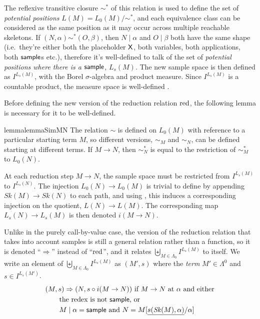 The reflexive transitive closure $\sim^*$ of this relation is used to define the set of \emph{potential positions} $L(M) = L_0(M) / \sim^*$, and each equivalence class can be considered as the same position as it may occur across multiple reachable skeletons. 
If $(N,\alpha) \sim^* (O,\beta)$, then $N \mid \alpha$ and $O \mid \beta$ both have the same shape (i.e.~they're either both the placeholder $\mathsf{X}$, both variables, both applications, both $\mathsf{sample}$s etc.), therefore it's well-defined to talk of the set of \emph{potential positions where there is a $\mathsf{sample}$}, $L_s(M)$.
The new sample space is then defined as $I^{L_s(M)}$, with the Borel $\sigma$-algebra and product measure.
Since $I^{L_s(M)}$ is a countable product, the measure space is well-defined \cite[Cor.~2.7.3]{AshDD00}.

\medskip
Before defining the new version of the reduction relation $\operatorname{red}$, the following lemma is necessary for it to be well-defined.

\begin{restatable}{lemma}{lemmaSimMN}
\label{lem:sim-M-N}
The relation $\sim$ is defined on $L_0(M)$ with reference to a particular starting term $M$, so different versions, $\sim_M$ and $\sim_N$, can be defined starting at different terms. If $M \to N$, then $\sim^*_N$ is equal to the restriction of $\sim^*_M$ to $L_0(N)$.
\end{restatable} 


At each reduction step $M \to N$, the sample space must be restricted from $I^{L_s(M)}$ to $I^{L_s(N)}$. 
The injection $L_0(N) \to L_0(M)$ is trivial to define by appending $\mathit{Sk}(M) \to \mathit{Sk}(N)$ to each path, and using , this induces a corresponding injection on the quotient, $L(N) \to L(M)$. 
The corresponding map $L_s(N) \to L_s(M)$ is then denoted $i(M \to N)$.

\begin{definition}
Unlike in the purely call-by-value case, the version of the reduction relation that takes into account samples is still a general relation rather than a function, so it is denoted ``$\Rightarrow$'' instead of ``$\operatorname{red}$'', and it relates $\biguplus_{M \in \Lambda_0} I^{L_s(M)}$ to itself.
We write an element of $\biguplus_{M \in \Lambda_0} I^{L_s(M)}$ as $(M', s)$ where the \emph{term} $M' \in \Lambda^0$ and $s \in  I^{L_s(M')}$.
\begin{align*}
& (M,s) \Rightarrow (N,s \circ i(M \to N)) \text{ if $M \to N$ at $\alpha$ and either} \\
& \qquad \text{the redex is not $\mathsf{sample}$, or} \\
& \qquad \text{$M \mid \alpha = \mathsf{sample}$ and $N = M[\underline{s(\mathit{Sk}(M),\alpha)}/\alpha]$}
\end{align*}
\end{definition}

